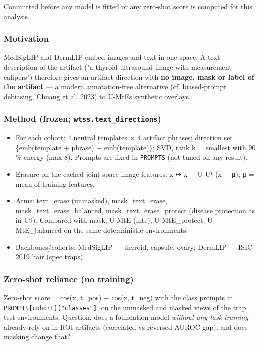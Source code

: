 {\small
Committed before any model is fitted or any zero-shot score is computed for this analysis.

\subsubsection{Motivation}\label{motivation}

MedSigLIP and DermLIP embed images and text in one space. A text description of the artifact ("a thyroid ultrasound
image with measurement calipers") therefore gives an artifact direction with \textbf{no image, mask or label of the
artifact} --- a modern annotation-free alternative (cf. biased-prompt debiasing, Chuang et al. 2023) to U-MtE\textquotesingle s
synthetic overlays.

\subsubsection{\texorpdfstring{Method (frozen; \texttt{wtss.text\_directions})}{Method (frozen; wtss.text\_directions)}}\label{method-frozen-wtsstext_directions}

\begin{itemize}

\item
  For each cohort: 4 neutral templates × 4 artifact phrases; direction set = \{emb(template + phrase) − emb(template)\};
  SVD, rank k = smallest with 90 \% energy (max 8). Prompts are fixed in \texttt{PROMPTS} (not tuned on any result).
\item
  Erasure on the cached joint-space image features: x ↦ x − U Uᵀ (x − μ), μ = mean of training features.
\item
  Arms: text\_erase (unmasked), mask\_text\_erase, mask\_text\_erase\_balanced, mask\_text\_erase\_protect (disease
  protection as in U9). Compared with mask, U-MtE (mte), U-MtE\_protect, U-MtE\_balanced on the same deterministic
  environments.
\item
  Backbones/cohorts: MedSigLIP --- thyroid, capsule, ovary; DermLIP --- ISIC 2019 hair (spec traps).
\end{itemize}

\subsubsection{Zero-shot reliance (no training)}\label{zero-shot-reliance-no-training}

Zero-shot score = cos(x, t\_pos) − cos(x, t\_neg) with the class prompts in \texttt{PROMPTS{[}cohort{]}{[}"classes"{]}}, on the
unmasked and masked views of the trap test environments. Question: does a foundation model \emph{without any task
training} already rely on in-ROI artifacts (correlated vs reversed AUROC gap), and does masking change that?

}

